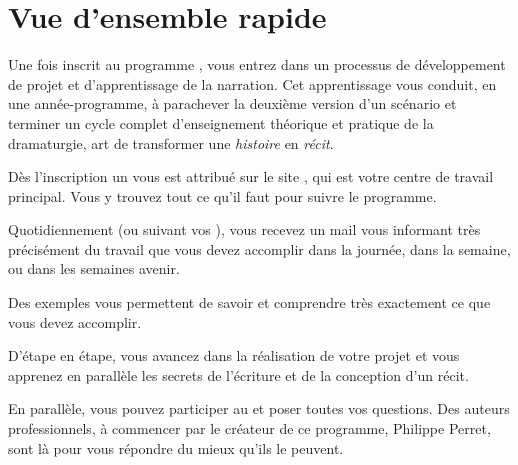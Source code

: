 \chapter{Vue d'ensemble rapide}\label{vueEnsembleRapide}

Une fois inscrit au programme \unan, vous entrez dans un processus de développement de projet et d'apprentissage de la narration. Cet apprentissage vous conduit, en une année-programme, à parachever la deuxième version d'un scénario et terminer un cycle complet d'enseignement théorique et pratique de la dramaturgie, art de transformer une \emph{histoire} en \emph{récit}.

Dès l'inscription un \bureau{} vous est attribué sur le site \boa{}, qui est votre centre de travail principal. Vous y trouvez tout ce qu'il faut pour suivre le programme.

Quotidiennement (ou suivant vos \preferences{}), vous recevez un mail vous informant très précisément du travail que vous devez accomplir dans la journée, dans la semaine, ou dans les semaines avenir.

Des exemples vous permettent de savoir et comprendre très exactement ce que vous devez accomplir.

D'étape en étape, vous avancez dans la réalisation de votre projet et vous apprenez en parallèle les secrets de l'écriture et de la conception d'un récit.

En parallèle, vous pouvez participer au \forum{} et poser toutes vos questions. Des auteurs professionnels, à commencer par le créateur de ce programme, Philippe Perret, sont là pour vous répondre du mieux qu'ils le peuvent.